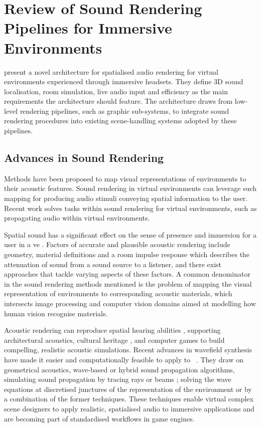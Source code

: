 \section{Review of Sound Rendering Pipelines for Immersive Environments}\label{sec:lr-visual-acoustic-mapping}
\cite{naef2002spatialized} present a novel architecture for spatialised audio rendering for virtual environments experienced through immersive headsets. They define 3D sound localisation, room simulation, live audio input and efficiency as the main requirements the architecture should feature. The architecture draws from low-level rendering pipelines, such as graphic sub-systems, to integrate sound rendering procedures into existing scene-handling systems adopted by these pipelines. 

\subsection{Advances in Sound Rendering}
Methods have been proposed to map visual representations of environments to their acoustic features. Sound rendering in virtual environments can leverage such mapping for producing audio stimuli conveying spatial information to the user. Recent work solves tasks within sound rendering for virtual environments, such as propagating audio within virtual environments.\par
Spatial sound has a significant effect on the sense of presence and immersion for a user in a \acrshort{ve} \citep{poeschl13}. Factors of accurate and plausible acoustic rendering include geometry, material definitions and a room impulse response which describes the attenuation of sound from a sound source to a listener, and there exist approaches that tackle varying aspects of these factors. A common denominator in the sound rendering methods mentioned is the problem of mapping the visual representation of environments to corresponding acoustic materials, which intersects image processing and computer vision domains aimed at modelling how human vision recognise materials.\par%
Acoustic rendering can reproduce spatial hearing abilities \citep{lokki2005navigation}, supporting architectural acoustics, cultural heritage \citep{berardi2016acoustic, vorlander2015virtual}, and computer games \citep{raghuvanshi2014parametric, mehra2015wave} to build compelling, realistic acoustic simulations. Recent advances in wavefield synthesis have made it easier and computationally feasible to apply to ~\citep{raghuvanshi2014parametric}. They draw on geometrical acoustics, wave-based or hybrid sound propagation algorithms, simulating sound propagation by tracing rays or beams \citep{hulusic2012acoustic}; solving the wave equations at discretised junctures of the representation of the environment or by a combination of the former techniques. These techniques enable virtual complex scene designers to apply realistic, spatialised audio to immersive applications and are becoming part of standardised workflows in game engines.\par
